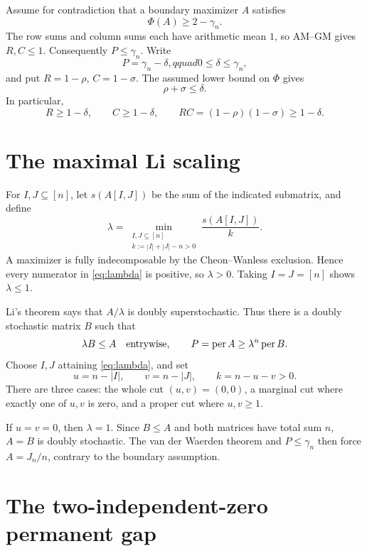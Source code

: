 \documentclass[11pt]{article}
\theoremstyle{remark}
\newcommand{\per}{\operatorname{per}}
\begin{document}
Assume for contradiction that a boundary maximizer $A$ satisfies
\[
 \Phi(A)\ge 2-\gamma_n.
\]
The row sums and column sums each have arithmetic mean $1$, so AM--GM gives
$R,C\le1$.  Consequently $P\le\gamma_n$.  Write
\[
 P=\gamma_n-\delta,qquad 0\le\delta\le\gamma_n,
\]
and put $R=1-\rho$, $C=1-\sigma$.  The assumed lower bound on $\Phi$ gives
\begin{equation}\label{eq:shared-deficit}
 \rho+\sigma\le\delta.
\end{equation}
In particular,
\begin{equation}\label{eq:product-lower}
 R\ge1-\delta,\qquad C\ge1-\delta,
 \qquad RC=(1-\rho)(1-\sigma)\ge1-\delta.
\end{equation}

\section{The maximal Li scaling}

For $I,J\subseteq[n]$, let $s(A[I,J])$ be the sum of the indicated
submatrix, and define
\begin{equation}\label{eq:lambda}
 \lambda=
 \min_{\substack{I,J\subseteq[n]\\k:=|I|+|J|-n>0}}
 \frac{s(A[I,J])}{k}.
\end{equation}
A maximizer is fully indecomposable by the Cheon--Wanless exclusion.  Hence
every numerator in \eqref{eq:lambda} is positive, so $\lambda>0$.  Taking
$I=J=[n]$ shows $\lambda\le1$.

Li's theorem says that $A/\lambda$ is doubly superstochastic.  Thus there is
a doubly stochastic matrix $B$ such that
\begin{equation}\label{eq:domination}
 \lambda B\le A\quad\hbox{entrywise},
 \qquad
 P=\per A\ge\lambda^n\per B.
\end{equation}
Choose $I,J$ attaining \eqref{eq:lambda}, and set
\[
 u=n-|I|,\qquad v=n-|J|,\qquad k=n-u-v>0.
\]
There are three cases: the whole cut $(u,v)=(0,0)$, a marginal cut where
exactly one of $u,v$ is zero, and a proper cut where $u,v\ge1$.

If $u=v=0$, then $\lambda=1$.  Since $B\le A$ and both matrices have total
sum $n$, $A=B$ is doubly stochastic.  The van der Waerden theorem and
$P\le\gamma_n$ then force $A=J_n/n$, contrary to the boundary assumption.

\section{The two-independent-zero permanent gap}
\end{document}
